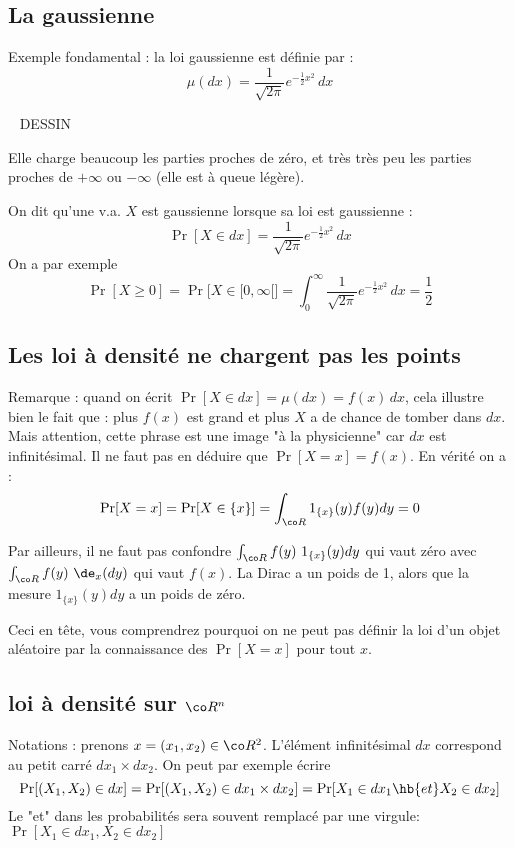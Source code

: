 \documentclass{article}
\def\dessin{\ \linebreak \vspace{0.5cm}  \linebreak  DESSIN  \vspace{1cm} \ \linebreak   }
\begin{document}
\subsection{La gaussienne}

Exemple fondamental :  la loi gaussienne est définie par : 
$$
    \mu(dx) = \frac 1 {\sqrt{2 \pi}}  e^{- \frac 1 2 x^2} \, dx 
$$

\dessin

Elle charge beaucoup les parties proches de zéro, et très très peu les parties proches de $+\infty$ ou $-\infty$ (elle est à queue légère).  

On dit qu'une  v.a.  $X$ est gaussienne lorsque sa  loi est gaussienne :
$$
\Pr[X\in dx ]   = \frac 1 {\sqrt{2 \pi}}  e^{- \frac 1 2 x^2} \, dx 
$$
On a  par exemple
$$
 \Pr[X \geq 0 ] = \Pr\Big[X\in [0,\infty [  \Big ] = \int_0^\infty   \frac 1 {\sqrt{2 \pi}}  e^{- \frac 1 2 x^2} \, dx = \frac 1 2
$$



\subsection{Les loi à densité ne chargent pas les points}

Remarque :    quand on écrit  $\Pr[X\in dx]=\mu(dx) =f(x) \, dx$, cela illustre bien le fait que : plus  $f(x)$ est grand et plus $X$ a de chance de tomber dans $dx$. Mais attention, cette phrase est une image "à la physicienne" car $dx$ est infinitésimal. Il ne faut pas en déduire que $\Pr[X=x]=f(x)$. En vérité on a :
$$
\Pr[X=x] = \Pr[X\in \{x\}] = \int_{\co R}  1_{\{x\}} (y) f(y) dy  =  0 
$$

Par ailleurs, il  ne faut pas confondre $\int_{\co R}   f(y)  \  1_{\{x\}} (y) dy  $ qui vaut zéro avec $ \int_{\co R}   f(y) \  \de_x(dy)$ qui vaut $f(x)$.  La Dirac a un poids de 1, alors que la mesure $1_{\{x\}} (y) dy  $ a un poids de zéro. 

Ceci en tête, vous comprendrez pourquoi on ne peut pas définir la loi d'un objet aléatoire par la connaissance des $\Pr[X=x]$ pour tout $x$. 


\subsection{loi à densité sur $\co R^n$}


Notations : prenons  $x=(x_1,x_2) \in \co R^2$. L'élément infinitésimal $dx$ correspond  au petit carré $dx_1 \times dx_2$.  On peut par exemple écrire
$$
\Pr[(X_1,X_2) \in  dx ] = \Pr[(X_1,X_2) \in  dx_1 \times dx_2]  =  \Pr[ X_1 \in  dx_1 \hb { et } X_2 \in dx_2]
$$
Le "et" dans les probabilités sera souvent remplacé par une virgule: $ \Pr[ X_1 \in  dx_1 ,  X_2 \in dx_2]$
\end{document}
